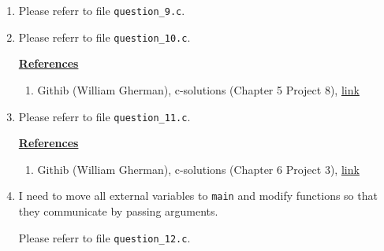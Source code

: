 \documentclass[12pt]{article}
\begin{document}
\begin{enumerate}[1.]
    \item

    Please referr to file \texttt{question\_9.c}.

    \item

    Please referr to file \texttt{question\_10.c}.

    \bigskip

    \underline{\textbf{References}}

    \begin{enumerate}[1)]
        \item Githib (William Gherman), c-solutions (Chapter 5 Project 8), \href{https://github.com/williamgherman/c-solutions/blob/master/05/projects/08/8.c}{link}
    \end{enumerate}

    \item

    Please referr to file \texttt{question\_11.c}.

    \bigskip

    \underline{\textbf{References}}

    \begin{enumerate}[1)]
        \item Githib (William Gherman), c-solutions (Chapter 6 Project 3), \href{https://github.com/williamgherman/c-solutions/blob/master/06/projects/03/3.c}{link}
    \end{enumerate}

    \item

    I need to move all external variables to \texttt{main} and modify functions
    so that they communicate by passing arguments.

    Please referr to file \texttt{question\_12.c}.
\end{enumerate}
\end{document}
